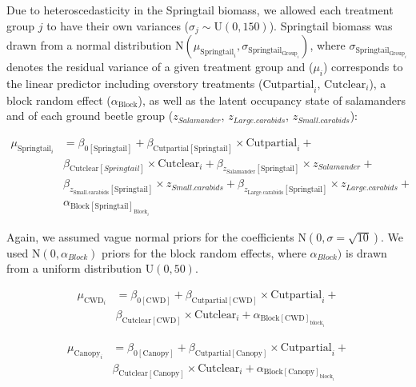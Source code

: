 Due to heteroscedasticity in the Springtail biomass, we allowed each treatment group $j$ to have their own variances ($\sigma_j \sim \text{U}(0,150)$). 
Springtail biomass was drawn from a normal distribution $\text{N} (\mu_{\text{Springtail}_i}, \sigma_{\text{Springtail}_{\text{Group}_i}})$, where $\sigma_{\text{Springtail}_{\text{Group}_i}}$ denotes the 
residual variance of a given treatment group and ($\mu_{i}$) corresponds to the linear predictor including overstory treatments ($\text{Cutpartial}_i$, $\text{Cutclear}_i$), 
a block random effect ($\alpha_{\text{Block}}$), as well as the latent occupancy state of salamanders and of each ground beetle group 
($z_{Salamander}$, $z_{Large.carabids}$, $z_{Small.carabids}$):


\begin{align}
  \mu_{\text{Springtail}_i} &= \beta_{0[\text{Springtail}]} + \beta_{\text{Cutpartial}[\text{Springtail}]} \times \text{Cutpartial}_i + \nonumber\\
  &\beta_{\text{Cutclear}[Springtail]} \times \text{Cutclear}_i + \beta_{z_{\text{Salamander}}[\text{Springtail}]} \times z_{Salamander} +  \nonumber\\
  &\beta_{z_{\text{Small.carabids}}[\text{Springtail}]} \times z_{Small.carabids} + \beta_{z_{\text{Large.carabids}}[\text{Springtail}]} \times z_{Large.carabids} + \nonumber\\
  &\alpha_{\text{Block}[\text{Springtail}]_{\text{Block}_i}} \nonumber
\end{align}


Again, we assumed vague normal priors for the coefficients $\text{N}(0, \sigma = \sqrt{10})$. 
We used $\text{N}(0, \alpha_{Block})$ priors for the block random effects, where $\alpha_{Block})$ is drawn from a uniform distribution $\text{U}(0, 50)$. 


\begin{align}
  \mu_{\text{CWD}_i} &= \beta_{0[\text{CWD}]} + \beta_{\text{Cutpartial}[\text{CWD}]} \times \text{Cutpartial}_{i} + \nonumber\\
  & \beta_{\text{Cutclear}[\text{CWD}]} \times \text{Cutclear}_{i} + \alpha_{\text{Block}[\text{CWD}]_{\text{block}_i}} 
\end{align}

\begin{align}
  \mu_{\text{Canopy}_i} &= \beta_{0[\text{Canopy}]} + \beta_{\text{Cutpartial}[\text{Canopy}]} \times \text{Cutpartial}_{i} + \nonumber \\
  & \beta_{\text{Cutclear}[\text{Canopy}]} \times \text{Cutclear}_{i} + \alpha_{\text{Block}[\text{Canopy}]_{\text{block}_i}} \nonumber
\end{align}

